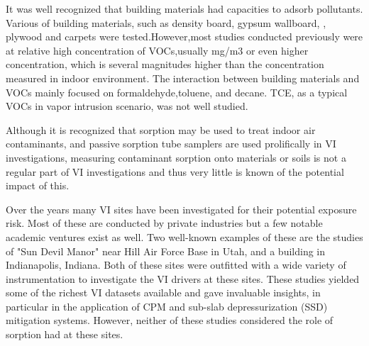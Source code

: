 It was well recognized that building materials had capacities to adsorb pollutants. Various of building materials, such as density board, \cite{wang_correlation_2008} gypsum wallboard,  \cite{xu_determination_2012}, plywood and carpets \cite{bodalal_method_2000} were tested.However,most studies conducted previously were at relative high concentration of VOCs,usually mg/m3 \cite{wang_correlation_2008} or even higher concentration, which is several magnitudes higher than the concentration measured in indoor environment. 
The interaction between building materials and VOCs mainly focused on  formaldehyde\cite{xu_determination_2012},toluene, and decane\cite{bodalal_method_2000}. TCE, as a typical VOCs in vapor intrusion scenario, was not well studied.


Although it is recognized that sorption may be used to treat indoor air contaminants, and passive sorption tube samplers are used prolifically in VI investigations, measuring contaminant sorption onto materials or soils is not a regular part of VI investigations and thus very little is known of the potential impact of this\cite{u.s._environmental_protection_agency_oswer_2015}.\par

Over the years many VI sites have been investigated for their potential exposure risk.
Most of these are conducted by private industries but a few notable academic ventures exist as well.
Two well-known examples of these are the studies of "Sun Devil Manor" near Hill Air Force Base in Utah, and a building in Indianapolis, Indiana.
Both of these sites were outfitted with a wide variety of instrumentation to investigate the VI drivers at these sites.
These studies yielded some of the richest VI datasets available and gave invaluable insights, in particular in the application of CPM\cite{holton_long-term_2015} and sub-slab depressurization (SSD) mitigation systems\cite{lutes_comparing_2015,u.s._environmental_protection_agency_assessment_2015}.
However, neither of these studies considered the role of sorption had at these sites.\par

